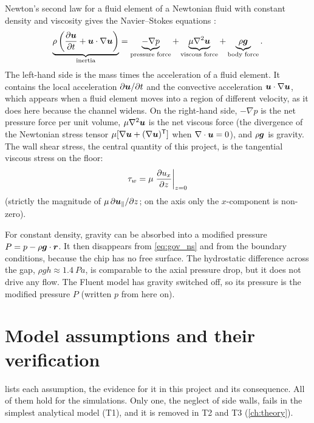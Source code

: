 Newton's second law for a fluid element of a Newtonian fluid with constant density and viscosity gives the Navier--Stokes equations \citep{BSL2002,Batchelor1967}:
\begin{equation}
\underbrace{\rho\left(\frac{\partial\bm{u}}{\partial t}+\bm{u}\cdot\nabla\bm{u}\right)}_{\text{inertia}}
=\underbrace{-\nabla p}_{\text{pressure force}}
+\underbrace{\mu\nabla^2\bm{u}}_{\text{viscous force}}
+\underbrace{\rho\bm{g}}_{\text{body force}} .
\label{eq:gov_ns}
\end{equation}
The left-hand side is the mass times the acceleration of a fluid element. It contains the local acceleration $\partial\bm{u}/\partial t$ and the convective acceleration $\bm{u}\cdot\nabla\bm{u}$, which appears when a fluid element moves into a region of different velocity, as it does here because the channel widens. On the right-hand side, $-\nabla p$ is the net pressure force per unit volume, $\mu\nabla^2\bm{u}$ is the net viscous force (the divergence of the Newtonian stress tensor $\mu[\nabla\bm{u}+(\nabla\bm{u})^{\mathsf T}]$ when $\nabla\cdot\bm{u}=0$), and $\rho\bm{g}$ is gravity. The wall shear stress, the central quantity of this project, is the tangential viscous stress on the floor:
\begin{equation}
\tau_{w}=\mu\left.\frac{\partial u_x}{\partial z}\right|_{z=0}
\label{eq:gov_tauw}
\end{equation}
(strictly the magnitude of $\mu\,\partial\bm{u}_{\parallel}/\partial z$; on the axis only the $x$-component is non-zero).

For constant density, gravity can be absorbed into a modified pressure $P=p-\rho\bm{g}\cdot\bm{r}$. It then disappears from \cref{eq:gov_ns} and from the boundary conditions, because the chip has no free surface. The hydrostatic difference across the gap, $\rho gh\approx\SI{1.4}{Pa}$, is comparable to the axial pressure drop, but it does not drive any flow. The Fluent model has gravity switched off, so its pressure is the modified pressure $P$ (written $p$ from here on).

\section{Model assumptions and their verification}

 lists each assumption, the evidence for it in this project and its consequence. All of them hold for the simulations. Only one, the neglect of side walls, fails in the simplest analytical model (T1), and it is removed in T2 and T3 (\cref{ch:theory}).

